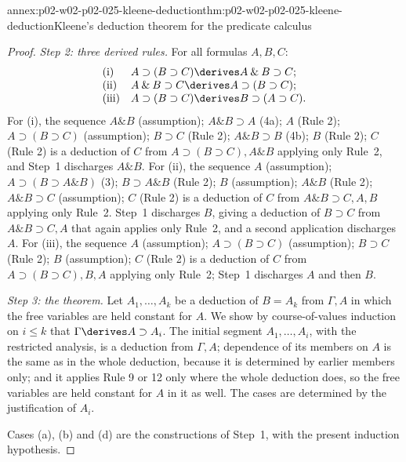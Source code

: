 \begin{annexitem}{annex:p02-w02-p02-025-kleene-deduction}{thm:p02-w02-p02-025-kleene-deduction}{Kleene's deduction theorem for the predicate calculus}
\begin{proof}
\emph{Step 2: three derived rules.}  For all formulas \(A,B,C\):
\[
\begin{array}{ll}
 \text{(i)} & A\supset(B\supset C)\derives A\mathbin{\&}B\supset C;\\
 \text{(ii)} & A\mathbin{\&}B\supset C\derives A\supset(B\supset C);\\
 \text{(iii)} & A\supset(B\supset C)\derives B\supset(A\supset C).
\end{array}
\]
For (i), the sequence \(A\mathbin{\&}B\) (assumption);
\(A\mathbin{\&}B\supset A\) (4a); \(A\) (Rule 2); \(A\supset(B\supset C)\)
(assumption); \(B\supset C\) (Rule 2); \(A\mathbin{\&}B\supset B\) (4b);
\(B\) (Rule 2); \(C\) (Rule 2) is a deduction of \(C\) from
\(A\supset(B\supset C),A\mathbin{\&}B\) applying only Rule~2, and Step~1
discharges \(A\mathbin{\&}B\).  For (ii), the sequence \(A\) (assumption);
\(A\supset(B\supset A\mathbin{\&}B)\) (3); \(B\supset A\mathbin{\&}B\)
(Rule 2); \(B\) (assumption); \(A\mathbin{\&}B\) (Rule 2);
\(A\mathbin{\&}B\supset C\) (assumption); \(C\) (Rule 2) is a deduction of
\(C\) from \(A\mathbin{\&}B\supset C,A,B\) applying only Rule~2.  Step~1
discharges \(B\), giving a deduction of \(B\supset C\) from
\(A\mathbin{\&}B\supset C,A\) that again applies only Rule~2, and a second
application discharges \(A\).  For (iii), the sequence \(A\) (assumption);
\(A\supset(B\supset C)\) (assumption); \(B\supset C\) (Rule 2); \(B\)
(assumption); \(C\) (Rule 2) is a deduction of \(C\) from
\(A\supset(B\supset C),B,A\) applying only Rule~2; Step~1 discharges \(A\)
and then \(B\).

\emph{Step 3: the theorem.}  Let \(A_1,\ldots,A_k\) be a deduction of
\(B=A_k\) from \(\Gamma,A\) in which the free variables are held constant for
\(A\).  We show by course-of-values induction on \(i\leq k\) that
\(\Gamma\derives A\supset A_i\).  The initial segment \(A_1,\ldots,A_i\),
with the restricted analysis, is a deduction from \(\Gamma,A\); dependence of
its members on \(A\) is the same as in the whole deduction, because it is
determined by earlier members only; and it applies Rule 9 or 12 only where
the whole deduction does, so the free variables are held constant for \(A\)
in it as well.  The cases are determined by the justification of \(A_i\).

Cases (a), (b) and (d) are the constructions of Step~1, with the present
induction hypothesis.


\end{proof}
\end{annexitem}
